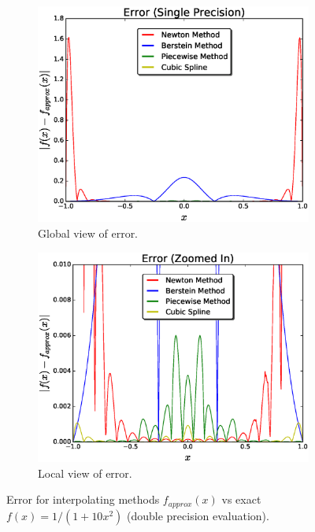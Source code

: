\documentclass[12pt]{article}
\theoremstyle{remark}
\begin{document}
\begin{figure}[H]
	\centering
	\begin{subfigure}{.5\textwidth}
		\centering
		\includegraphics[width=1.1\linewidth]{errorFig1.eps}
		\caption{Global view of error.}
		\label{fig:sub1}
	\end{subfigure}%
	\begin{subfigure}{.5\textwidth}
		\centering
		\includegraphics[width=1.1\linewidth]{errorFigg1.eps}
		\caption{Local view of error.}
		\label{fig:sub2}
	\end{subfigure}
	\caption{Error for interpolating methods $f_{approx}(x)$ vs exact $f(x) = 1/(1 + 10x^2)$ (double precision evaluation). }
	\label{fig:test}
\end{figure}
\end{document}
